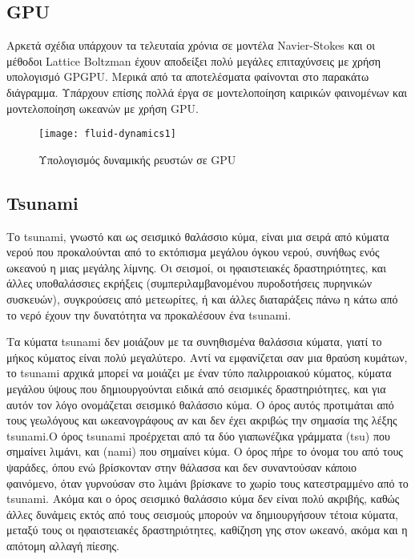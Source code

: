\subsection{GPU}
Αρκετά σχέδια υπάρχουν τα τελευταία χρόνια σε μοντέλα Navier-Stokes και οι μέθοδοι Lattice Boltzman έχουν αποδείξει πολύ μεγάλες επιταχύνσεις με χρήση υπολογισμό GPGPU. Μερικά από τα αποτελέσματα φαίνονται στο παρακάτω διάγραμμα. Υπάρχουν επίσης πολλά έργα σε μοντελοποίηση καιρικών φαινομένων και μοντελοποίηση ωκεανών με χρήση GPU.

\begin{figure}[h]
\centering
\hspace*{-0.5in}
\texttt{[image: fluid-dynamics1]}
\caption{Υπολογισμός δυναμικής ρευστών σε GPU}
\end{figure}
 
\subsection{Tsunami}
Το tsunami, γνωστό και ως σεισμικό θαλάσσιο κύμα, είναι μια σειρά από κύματα νερού που προκαλούνται από το εκτόπισμα μεγάλου όγκου νερού, συνήθως ενός ωκεανού η μιας μεγάλης λίμνης. Οι σεισμοί, οι ηφαιστειακές δραστηριότητες, και άλλες υποθαλάσσιες εκρήξεις (συμπεριλαμβανομένου πυροδοτήσεις πυρηνικών συσκευών), συγκρούσεις από μετεωρίτες, ή και άλλες διαταράξεις πάνω η κάτω από το νερό έχουν την δυνατότητα να προκαλέσουν ένα tsunami.

Τα κύματα tsunami δεν μοιάζουν με τα συνηθισμένα θαλάσσια κύματα, γιατί το μήκος κύματος είναι πολύ μεγαλύτερο. Αντί να εμφανίζεται σαν μια θραύση κυμάτων, το tsunami αρχικά μπορεί να μοιάζει με έναν τύπο παλιρροιακού κύματος,  κύματα μεγάλου ύψους που δημιουργούνται ειδικά από σεισμικές δραστηριότητες, και για αυτόν τον λόγο ονομάζεται σεισμικό θαλάσσιο κύμα. Ο όρος αυτός προτιμάται από τους γεωλόγους και ωκεανογράφους αν και δεν έχει ακριβώς την σημασία της λέξης tsunami.Ο όρος tsunami προέρχεται από τα δύο γιαπωνέζικα γράμματα {\large{}}(tsu) που σημαίνει λιμάνι, και {\large{}}(nami) που σημαίνει κύμα. Ο όρος πήρε το όνομα του από τους ψαράδες, όπου ενώ βρίσκονταν στην θάλασσα και δεν συναντούσαν κάποιο φαινόμενο, όταν γυρνούσαν στο λιμάνι βρίσκανε το χωρίο τους κατεστραμμένο από το tsunami. Ακόμα και ο όρος σεισμικό θαλάσσιο κύμα δεν είναι πολύ ακριβής, καθώς άλλες δυνάμεις εκτός από τους σεισμούς μπορούν να δημιουργήσουν τέτοια κύματα, μεταξύ τους οι ηφαιστειακές δραστηριότητες, καθίζηση γης στον ωκεανό, ακόμα και η απότομη αλλαγή πίεσης. \cite{fluiddynamics-3}
 
